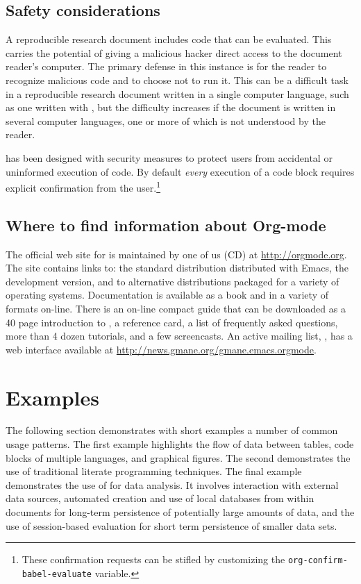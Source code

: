 \documentclass[article,shortnames]{jss}
\begin{document}
\subsection{Safety considerations}
\label{sec-3-5}

A reproducible research document includes code that can be evaluated.
This carries the potential of giving a malicious hacker direct access
to the document reader's computer.  The primary defense in this
instance is for the reader to recognize malicious code and to choose
not to run it.  This can be a difficult task in a reproducible
research document written in a single computer language, such as one
written with , but the difficulty increases if the document is
written in several computer languages, one or more of which is not
understood by the reader.

 has been designed with security measures to protect users
from accidental or uninformed execution of code.  By default \emph{every}
execution of a code block requires explicit confirmation from the
user.\footnote{These confirmation requests can be stifled by customizing
the \texttt{org-confirm-babel-evaluate} variable. }
\subsection{Where to find information about Org-mode}
\label{sec-3-6}

The official web site for  is maintained by one of us (CD) at
\url{http://orgmode.org}.  The site contains links to: the standard
distribution distributed with Emacs, the development version, and to
alternative distributions packaged for a variety of operating systems.
Documentation is available as a book
\citep{dominik10:_org_mode_refer_manual} and in a variety of formats
on-line. There is an on-line compact guide that can be downloaded as a
40 page introduction to , a reference card, a list of
frequently asked questions, more than 4 dozen tutorials, and a few
screencasts.  An active mailing list, ,
has a web interface available at \url{http://news.gmane.org/gmane.emacs.orgmode}.
\section{Examples}
\label{sec-4}
\label{examples}


The following section demonstrates with short examples a number of
common  usage patterns.  The first example highlights the flow
of data between tables, code blocks of multiple languages, and
graphical figures.  The second demonstrates the use of traditional
literate programming techniques.  The final example demonstrates the
use of  for data analysis. It involves interaction with
external data sources, automated creation and use of local databases
from within  documents for long-term persistence of
potentially large amounts of data, and the use of session-based
evaluation for short term persistence of smaller data sets.
\end{document}
